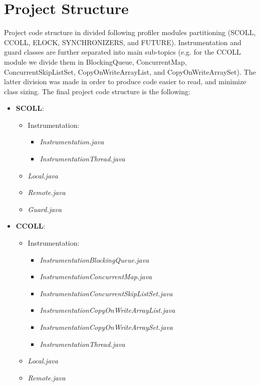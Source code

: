 \documentclass[]{usiinfthesis}
\begin{document}
\section{Project Structure}
Project code structure in divided following profiler modules partitioning (SCOLL, CCOLL, ELOCK, SYNCHRONIZERS, and FUTURE). Instrumentation and guard classes are further separated into main sub-topics (e.g. for the CCOLL module we divide them in BlockingQueue, ConcurrentMap, ConcurrentSkipListSet, CopyOnWriteArrayList, and CopyOnWriteArraySet). The latter division was made in order to produce code easier to read, and minimize class sizing. The final project code structure is the following:

\small
\begin{itemize}
    \item \textbf{SCOLL}:
    \begin{itemize}
        \item Instrumentation:
        \begin{itemize}
            \item \textit{Instrumentation.java}
            \item \textit{InstrumentationThread.java}
        \end{itemize}
        \item \textit{Local.java}
        \item \textit{Remote.java}
        \item \textit{Guard.java}
    \end{itemize}
    \item \textbf{CCOLL}:
    \begin{itemize}
        \item Instrumentation:
        \begin{itemize}
            \item \textit{InstrumentationBlockingQueue.java}
            \item \textit{InstrumentationConcurrentMap.java}
            \item \textit{InstrumentationConcurrentSkipListSet.java}
            \item \textit{InstrumentationCopyOnWriteArrayList.java}
            \item \textit{InstrumentationCopyOnWriteArraySet.java}
            \item \textit{InstrumentationThread.java}
        \end{itemize}
        \item \textit{Local.java}
        \item \textit{Remote.java}

\end{itemize}
\end{itemize}
\end{document}
